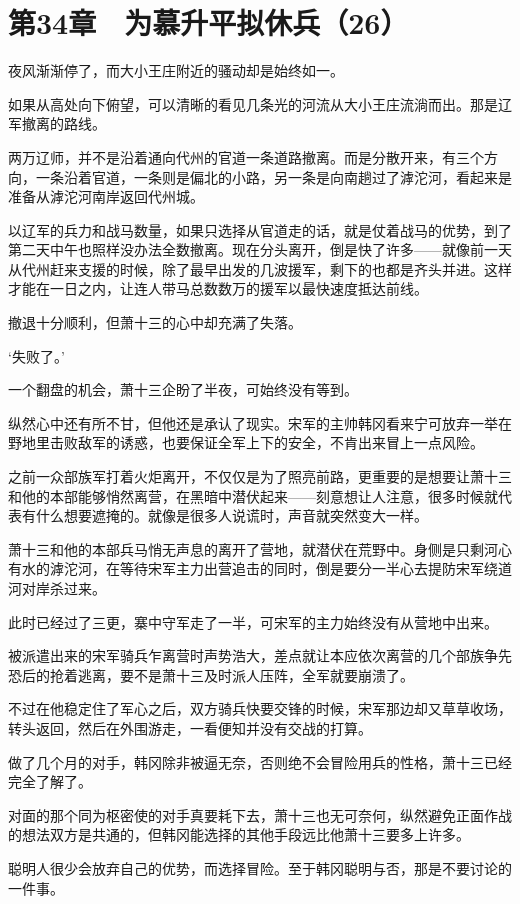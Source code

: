 \section{第34章　为慕升平拟休兵（26）}

夜风渐渐停了，而大小王庄附近的骚动却是始终如一。

如果从高处向下俯望，可以清晰的看见几条光的河流从大小王庄流淌而出。那是辽军撤离的路线。

两万辽师，并不是沿着通向代州的官道一条道路撤离。而是分散开来，有三个方向，一条沿着官道，一条则是偏北的小路，另一条是向南趟过了滹沱河，看起来是准备从滹沱河南岸返回代州城。

以辽军的兵力和战马数量，如果只选择从官道走的话，就是仗着战马的优势，到了第二天中午也照样没办法全数撤离。现在分头离开，倒是快了许多——就像前一天从代州赶来支援的时候，除了最早出发的几波援军，剩下的也都是齐头并进。这样才能在一日之内，让连人带马总数数万的援军以最快速度抵达前线。

撤退十分顺利，但萧十三的心中却充满了失落。

‘失败了。’

一个翻盘的机会，萧十三企盼了半夜，可始终没有等到。

纵然心中还有所不甘，但他还是承认了现实。宋军的主帅韩冈看来宁可放弃一举在野地里击败敌军的诱惑，也要保证全军上下的安全，不肯出来冒上一点风险。

之前一众部族军打着火炬离开，不仅仅是为了照亮前路，更重要的是想要让萧十三和他的本部能够悄然离营，在黑暗中潜伏起来——刻意想让人注意，很多时候就代表有什么想要遮掩的。就像是很多人说谎时，声音就突然变大一样。

萧十三和他的本部兵马悄无声息的离开了营地，就潜伏在荒野中。身侧是只剩河心有水的滹沱河，在等待宋军主力出营追击的同时，倒是要分一半心去提防宋军绕道河对岸杀过来。

此时已经过了三更，寨中守军走了一半，可宋军的主力始终没有从营地中出来。

被派遣出来的宋军骑兵乍离营时声势浩大，差点就让本应依次离营的几个部族争先恐后的抢着逃离，要不是萧十三及时派人压阵，全军就要崩溃了。

不过在他稳定住了军心之后，双方骑兵快要交锋的时候，宋军那边却又草草收场，转头返回，然后在外围游走，一看便知并没有交战的打算。

做了几个月的对手，韩冈除非被逼无奈，否则绝不会冒险用兵的性格，萧十三已经完全了解了。

对面的那个同为枢密使的对手真要耗下去，萧十三也无可奈何，纵然避免正面作战的想法双方是共通的，但韩冈能选择的其他手段远比他萧十三要多上许多。

聪明人很少会放弃自己的优势，而选择冒险。至于韩冈聪明与否，那是不要讨论的一件事。

